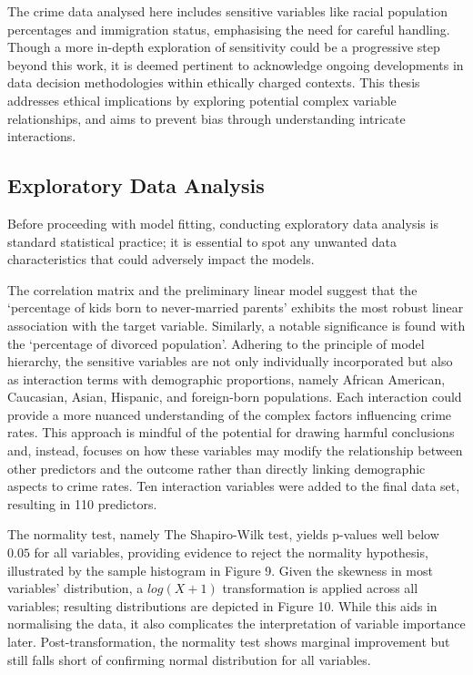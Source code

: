 \documentclass[
  11pt,
]{article}
\begin{document}
The crime data analysed here includes sensitive variables like racial
population percentages and immigration status, emphasising the need for
careful handling. Though a more in-depth exploration of sensitivity
could be a progressive step beyond this work, it is deemed pertinent to
acknowledge ongoing developments in data decision methodologies within
ethically charged contexts. This thesis addresses ethical implications
by exploring potential complex variable relationships, and aims to
prevent bias through understanding intricate interactions.

\subsection{Exploratory Data Analysis}

Before proceeding with model fitting, conducting exploratory data
analysis is standard statistical practice; it is essential to spot any
unwanted data characteristics that could adversely impact the models.

The correlation matrix and the preliminary linear model suggest that the
`percentage of kids born to never-married parents' exhibits the most
robust linear association with the target variable. Similarly, a notable
significance is found with the `percentage of divorced population'.
Adhering to the principle of model hierarchy, the sensitive variables
are not only individually incorporated but also as interaction terms
with demographic proportions, namely African American, Caucasian, Asian,
Hispanic, and foreign-born populations. Each interaction could provide a
more nuanced understanding of the complex factors influencing crime
rates. This approach is mindful of the potential for drawing harmful
conclusions and, instead, focuses on how these variables may modify the
relationship between other predictors and the outcome rather than
directly linking demographic aspects to crime rates. Ten interaction
variables were added to the final data set, resulting in 110 predictors.

The normality test, namely The Shapiro-Wilk test, yields p-values well
below \(0.05\) for all variables, providing evidence to reject the
normality hypothesis, illustrated by the sample histogram in Figure 9.
Given the skewness in most variables' distribution, a \(log(X + 1)\)
transformation is applied across all variables; resulting distributions
are depicted in Figure 10. While this aids in normalising the data, it
also complicates the interpretation of variable importance later.
Post-transformation, the normality test shows marginal improvement but
still falls short of confirming normal distribution for all variables.
\end{document}
